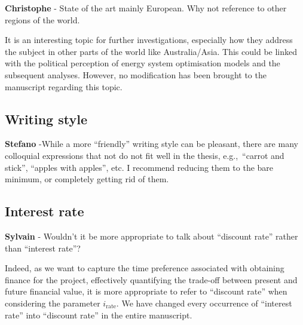 \documentclass[12pt,a4paper]{article}
\def\eg{e.g.,\ }
\begin{document}
\noindent

\begin{mdframed}[style=manuscript] %

\end{mdframed}

\begin{mdframed}[style=comment] %
{\color{violet} \textbf{Christophe}} - State of the art mainly European. Why not reference to other regions of the world.
\end{mdframed}

\noindent
It is an interesting topic for further investigations, especially how they address the subject in other parts of the world like Australia/Asia. This could be linked with the political perception of energy system optimisation models and the subsequent analyses. However, no modification has been brought to the manuscript regarding this topic.

\subsection{Writing style}
\label{writing_style}

\begin{mdframed}[style=comment] %
{\color{orange} \textbf{Stefano}} -While a more ``friendly'' writing style can be pleasant, there are many colloquial expressions that not do not fit well in the thesis, \eg ``carrot and stick'', ``apples with apples'', etc. I recommend reducing them to the bare minimum, or completely getting rid of them. 
\end{mdframed}

\noindent

\begin{mdframed}[style=manuscript] %

\end{mdframed}


\subsection{Interest rate}
\label{irate}
\begin{mdframed}[style=comment] %
{\color{purple} \textbf{Sylvain}} - Wouldn't it be more appropriate to talk about ``discount rate'' rather than ``interest rate''?
\end{mdframed}

\noindent Indeed, as we want to capture the time preference associated with obtaining finance for the project, effectively quantifying the trade-off between present and future financial value, it is more appropriate to refer to ``discount rate'' when considering the parameter $i_{\text{rate}}$. We have changed every occurrence of ``interest rate'' into ``discount rate'' {\color{blue}in the entire manuscript}.
\end{document}
